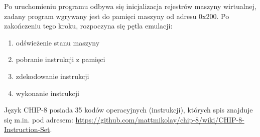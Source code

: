 \documentclass[a4paper,12pt]{report}
\begin{document}
\clearpage

Po uruchomieniu programu odbywa się inicjalizacja rejestrów maszyny wirtualnej, zadany program wgrywany jest do pamięci maszyny od adresu 0x200. Po zakończeniu tego kroku, rozpoczyna się pętla emulacji:
\begin{enumerate}
    \item odświeżenie stanu maszyny
    \item pobranie instrukcji z pamięci
    \item zdekodowanie instrukcji
    \item wykonanie instrukcji
\end{enumerate}

Język CHIP-8 posiada 35 kodów operacyjnych (instrukcji), których spis znajduje się m.in. pod adresem: \href{https://github.com/mattmikolay/chip-8/wiki/CHIP\%E2\%80\%908-Instruction-Set}{https://github.com/mattmikolay/chip-8/wiki/CHIP-8-Instruction-Set}.
\end{document}
